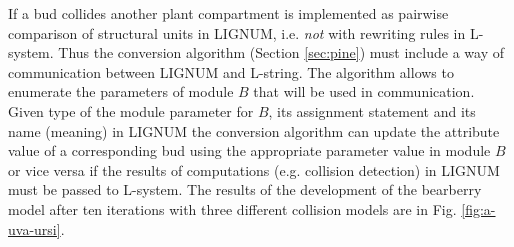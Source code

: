 If a bud collides another plant compartment is implemented as pairwise
comparison  of  structural units  in  LIGNUM,  i.e. \textsl{not}  with
rewriting rules  in L-system.  Thus the  conversion algorithm (Section
\ref{sec:pine}) must include a way of communication between LIGNUM and
L-string. The  algorithm allows to enumerate the  parameters of module
$B$  that will be  used in  communication.  Given  type of  the module
parameter for $B$, its assignment  statement and its name (meaning) in
LIGNUM the  conversion algorithm can  update the attribute value  of a
corresponding bud using the  appropriate parameter value in module $B$
or  vice  versa  if  the  results  of  computations  (e.g.   collision
detection) in  LIGNUM must be passed  to L-system. The  results of the
development  of the bearberry  model after  ten iterations  with three
different collision models are in Fig. \ref{fig:a-uva-ursi}.
 
